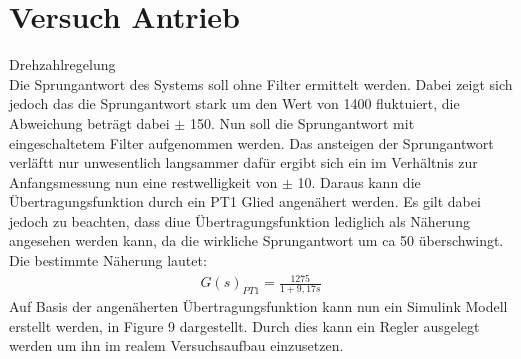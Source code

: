 \documentclass[10pt]{scrartcl}
\begin{document}
\section{Versuch Antrieb}
Drehzahlregelung\\
Die Sprungantwort des Systems soll ohne Filter ermittelt werden. Dabei zeigt sich jedoch das die Sprungantwort stark um den Wert von 1400 fluktuiert, die Abweichung beträgt dabei $\pm$ 150.
Nun soll die Sprungantwort mit eingeschaltetem Filter aufgenommen werden. Das ansteigen der Sprungantwort verläftt nur unwesentlich langsammer dafür ergibt sich ein im Verhältnis zur Anfangsmessung nun eine restwelligkeit von $\pm$ 10. Daraus kann die Übertragungsfunktion durch ein PT1 Glied angenähert werden. Es gilt dabei jedoch zu beachten, dass diue Übertragungsfunktion lediglich als Näherung angesehen werden kann, da die wirkliche Sprungantwort um ca 50 überschwingt. Die bestimmte Näherung lautet: 
\begin{align}
   G(s)_{PT1}=\frac{1275}{1+9,17s}
\end{align}
Auf Basis der angenäherten Übertragungsfunktion kann nun ein Simulink Modell erstellt werden, in Figure 9 dargestellt. Durch dies kann ein Regler ausgelegt werden um ihn im realem Versuchsaufbau einzusetzen.\\
\end{document}
